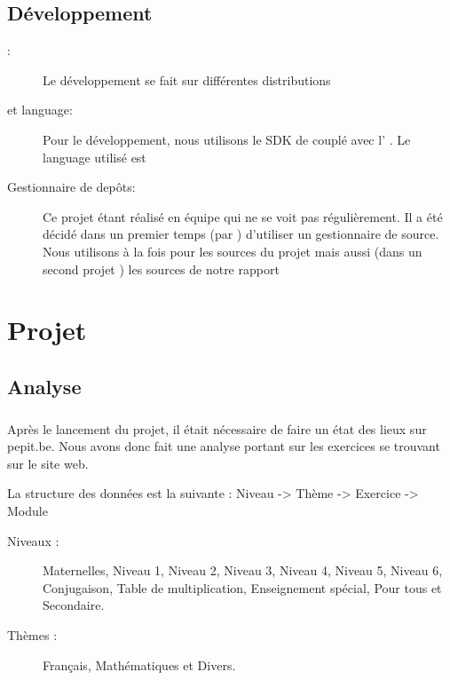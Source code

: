 \documentclass[french]{report}
\begin{document}
\section{Développement}
\begin{description}
\item[\os{}: ] Le développement se fait sur différentes distributions \linux{}
\item[\ide{} et language: ] Pour le développement, nous utilisons le SDK de \android{} couplé avec l'\ide{} \eclipse{}. Le language utilisé est \java{}
\item[Gestionnaire de depôts: ] Ce projet étant réalisé en équipe qui ne se voit pas régulièrement. Il a été décidé dans un premier temps (par \responsableProjet{}) d'utiliser un gestionnaire de source. Nous utilisons \github{} à la fois pour les sources du projet mais aussi (dans un second projet \github{}) les sources de notre rapport
\end{description}


\chapter{Projet}
\section{Analyse}
\paragraph{}Après le lancement du projet, il était nécessaire de faire un état des lieux sur pepit.be. Nous avons donc fait une analyse portant sur les exercices se trouvant sur le site web.

La structure des données est la suivante : Niveau -> Thème -> Exercice -> Module

\begin{description}
\item[Niveaux : ] Maternelles, Niveau 1, Niveau 2, Niveau 3, Niveau 4, Niveau 5, Niveau 6, Conjugaison, Table de multiplication, Enseignement spécial, Pour tous et Secondaire.
\item[Thèmes : ] Français, Mathématiques et Divers.
\end{description}
\end{document}
